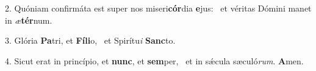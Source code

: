 2. Quóniam confirmáta est super nos miseri\textbf{cór}dia \textbf{e}jus: \ast\  et véritas Dómini manet in \textit{æ}\textbf{tér}num.\

3. Glória \textbf{Pa}tri, et \textbf{Fí}\textbf{li}o, \ast\  et Spirítu\textit{i} \textbf{Sanc}to.\

4. Sicut erat in princípio, et \textbf{nunc}, et \textbf{sem}per, \ast\  et in sǽcula sæculó\textit{rum}. \textbf{A}men.\

